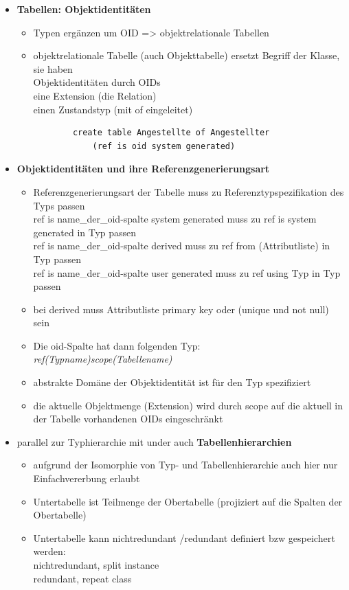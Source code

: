 \begin{itemize}
	\item \textbf{Tabellen: Objektidentitäten}
	\begin{itemize}
		\item Typen ergänzen um OID => objektrelationale Tabellen
		\item objektrelationale Tabelle (auch Objekttabelle) ersetzt Begriff der Klasse, sie haben\\
		Objektidentitäten durch OIDs\\
		eine Extension (die Relation)\\
		einen Zustandstyp (mit of eingeleitet)
		\begin{lstlisting}
		create table Angestellte of Angestellter
			(ref is oid system generated)
		\end{lstlisting}
	\end{itemize}
	
	\item \textbf{Objektidentitäten und ihre Referenzgenerierungsart}
	\begin{itemize}
		\item Referenzgenerierungsart der Tabelle muss zu Referenztypspezifikation des Typs passen\\
		ref is name\_der\_oid-spalte system generated muss zu ref is system generated in Typ passen\\
		ref is name\_der\_oid-spalte derived muss zu ref from (Attributliste) in Typ passen\\
		ref is name\_der\_oid-spalte user generated muss zu ref using Typ in Typ passen
		\item bei derived muss Attributliste primary key oder (unique und not null) sein
		\item Die oid-Spalte hat dann folgenden Typ:\\
		\textit{ref(Typname)scope(Tabellename)}
		\item abstrakte Domäne der Objektidentität ist für den Typ spezifiziert
		\item die aktuelle Objektmenge (Extension) wird durch scope auf die aktuell in der Tabelle vorhandenen OIDs eingeschränkt
	\end{itemize}
	
	\item parallel zur Typhierarchie mit under auch \textbf{Tabellenhierarchien}
	\begin{itemize}
		\item aufgrund der Isomorphie von Typ- und Tabellenhierarchie auch hier nur Einfachvererbung erlaubt
		\item Untertabelle ist Teilmenge der Obertabelle (projiziert auf die Spalten der Obertabelle)
		\item Untertabelle kann nichtredundant /redundant definiert bzw gespeichert werden:\\
		nichtredundant, split instance\\
		redundant, repeat class
	\end{itemize}
\end{itemize}


